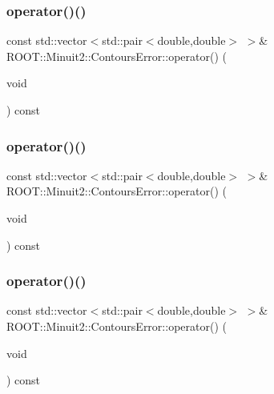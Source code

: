\subsubsection{\texorpdfstring{operator()()}{operator()()}\hspace{0.1cm}{\footnotesize\ttfamily [4/6]}}
{\footnotesize\ttfamily const std\+::vector$<$std\+::pair$<$double,double$>$ $>$\& R\+O\+O\+T\+::\+Minuit2\+::\+Contours\+Error\+::operator() (\begin{DoxyParamCaption}\item[{void}]{ }\end{DoxyParamCaption}) const\hspace{0.3cm}{\ttfamily [inline]}}

\mbox{\label{classROOT_1_1Minuit2_1_1ContoursError_ad73e9dd73b1b7480342dd523e78a8def}} 
\subsubsection{\texorpdfstring{operator()()}{operator()()}\hspace{0.1cm}{\footnotesize\ttfamily [5/6]}}
{\footnotesize\ttfamily const std\+::vector$<$std\+::pair$<$double,double$>$ $>$\& R\+O\+O\+T\+::\+Minuit2\+::\+Contours\+Error\+::operator() (\begin{DoxyParamCaption}\item[{void}]{ }\end{DoxyParamCaption}) const\hspace{0.3cm}{\ttfamily [inline]}}

\mbox{\label{classROOT_1_1Minuit2_1_1ContoursError_ad73e9dd73b1b7480342dd523e78a8def}} 
\subsubsection{\texorpdfstring{operator()()}{operator()()}\hspace{0.1cm}{\footnotesize\ttfamily [6/6]}}
{\footnotesize\ttfamily const std\+::vector$<$std\+::pair$<$double,double$>$ $>$\& R\+O\+O\+T\+::\+Minuit2\+::\+Contours\+Error\+::operator() (\begin{DoxyParamCaption}\item[{void}]{ }\end{DoxyParamCaption}) const\hspace{0.3cm}{\ttfamily [inline]}}

